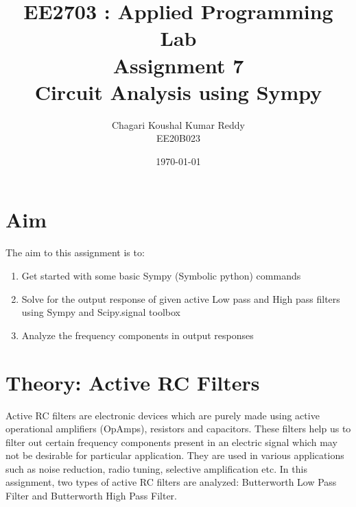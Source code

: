 \documentclass[12pt, a4paper]{article}
\title{\textbf{EE2703 : Applied Programming Lab \\ Assignment 7 \\ Circuit Analysis using Sympy}}
\author{Chagari Koushal Kumar Reddy \\ EE20B023} %
\date{\today} %
\begin{document}
		

\maketitle %
\clearpage

\tableofcontents
\clearpage

\section{Aim}
The aim to this assignment is to:
\begin{enumerate}
    \item Get started with some basic Sympy (Symbolic python) commands
    \item Solve for the output response of given active Low pass and High pass filters using Sympy and Scipy.signal toolbox
    \item Analyze the frequency components in output responses
\end{enumerate}
\section{Theory: Active RC Filters}
Active RC filters are electronic devices which are purely made using active operational amplifiers (OpAmps), resistors and capacitors.
These filters help us to filter out certain frequency components present in an electric signal which may not be desirable for particular application.
They are used in various applications such as noise reduction, radio tuning, selective amplification etc. In this assignment, two types of active RC filters are analyzed: Butterworth Low Pass Filter and Butterworth High Pass Filter.
\end{document}
